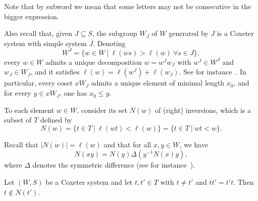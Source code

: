 Note that by subword we mean that some letters may not be consecutive in the bigger expression. 

Also recall that, given $J\subseteq S$, the subgroup $W_J$ of $W$ generated by $J$ is a Coxeter system with simple system $J$. Denoting $$W^J=\{w\in W \ \vert \ \ell(ws)>\ell(w)~\forall s\in J\},$$ every $w\in W$ admits a unique decomposition $w=w^J w_J$ with $w^J\in W^J$ and $w_J \in W_J$, and it satisfies $\ell(w)=\ell(w^J)+\ell(w_J)$. See for instance~\cite[Section 2.4]{BB}. In particular, every coset $x W_J$ admits a unique element of minimal length $x_0$, and for every $y\in x W_J$, one has $x_0 \leq y$. 

To each element $w\in W$, consider its set $N(w)$ of (right) inversions, which is a subset of $T$ defined by $$N(w)=\{t\in T \ \vert \ \ell(wt)<\ell(w)\}=\{t\in T \ \vert \ wt<w\}.$$

Recall that $|N(w)|=\ell(w)$ and that for all $x,y\in W$, we have $$N(xy)=N(y)\Delta (y^{-1} N(x) y),$$ where $\Delta$ denotes the symmetric difference (see for instance~\cite[Chapter 1, Exercise 12]{BB}).

\begin{lemma}\label{lem_ref_commute}
	Let $(W,S)$ be a Coxeter system and let $t, t'\in T$ with $t\neq t'$ and $tt'=t't$. Then $t\notin N(t')$. 
\end{lemma}

